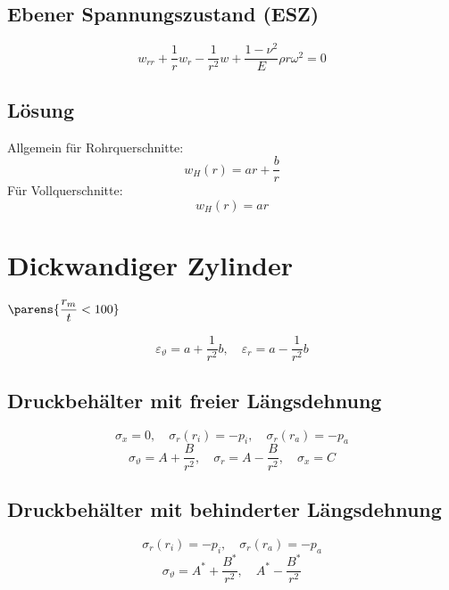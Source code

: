	\subsection{Ebener Spannungszustand (ESZ)} %
		\begin{equation*}
			w_{rr} + \frac{1}{r}w_r - \frac{1}{r^2}w + \frac{1-\nu^2}{E}\rho r \omega^2=0
		\end{equation*}
	\subsection{Lösung} %
		Allgemein für Rohrquerschnitte:
		\begin{equation*}
			w_H(r) = ar + \frac{b}{r}
		\end{equation*}
		Für Vollquerschnitte:
		\begin{equation*}
			w_H(r) = ar
		\end{equation*}
\section{Dickwandiger Zylinder} %
	\begin{flushright}
		\vspace{-1cm}
		$\displaystyle\parens{\frac{r_m}{t} < 100}$
		\vspace{0cm}
	\end{flushright}
	\begin{equation*}
		\varepsilon_\vartheta = a + \frac{1}{r^2}b, \quad \varepsilon_r = a - \frac{1}{r^2}b
	\end{equation*}
	
	\subsection{Druckbehälter mit freier Längsdehnung} %
		\begin{equation*}
			\sigma_x = 0, \quad \sigma_r (r_i) = - p_i, \quad \sigma_r (r_a) = - p_a
		\end{equation*}
		\begin{equation*}
			\sigma_\vartheta = A + \frac{B}{r^2}, \quad \sigma_r = A - \frac{B}{r^2}, \quad \sigma_x = C
		\end{equation*}
	\subsection{Druckbehälter mit behinderter Längsdehnung} %
		\begin{equation*}
			\sigma_r (r_i) = - p_i, \quad \sigma_r (r_a) = - p_a
		\end{equation*}
		\begin{equation*}
			\sigma_\vartheta = A^* + \frac{B^*}{r^2}, \quad A^* - \frac{B^*}{r^2}
		\end{equation*}
